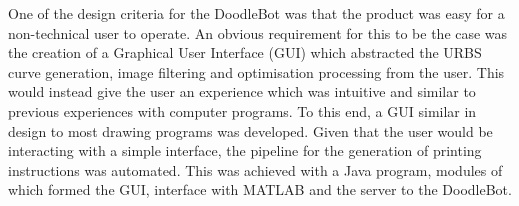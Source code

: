 One of the design criteria for the DoodleBot was that the product was easy for a non-technical user to operate. An obvious requirement for this to be the case was the creation of a Graphical User Interface (GUI) which abstracted the URBS curve generation, image filtering and optimisation processing from the user. This would instead give the user an experience which was intuitive and similar to previous experiences with computer programs. To this end, a GUI similar in design to most drawing programs was developed.
Given that the user would be interacting with a simple interface, the pipeline for the generation of printing instructions was automated. This was achieved with a Java program, modules of which formed the GUI, interface with MATLAB\textsuperscript{\textregistered} and the server to the DoodleBot.